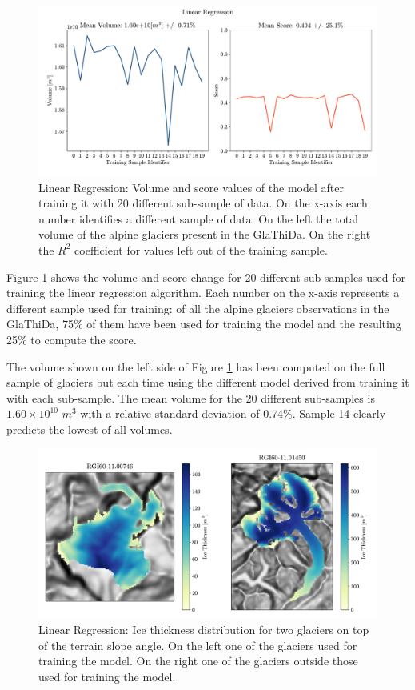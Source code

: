 \begin{figure}[!tp]
	\centering		  
	\includegraphics[width=1.\textwidth]{figures/LR_score.pdf}
	\caption{Linear Regression: Volume and score values of the model after training it with 20 different sub-sample of data. On the x-axis each number identifies a different sample of data. On the left the total volume of the alpine glaciers present in the GlaThiDa. On the right the $R^2$ coefficient for values left out of the training sample.}
	\label{fig:lr-score}
\end{figure}

Figure \ref{fig:lr-score} shows the volume and score change  for 20 different sub-samples used for training the linear regression algorithm. Each number on the x-axis represents a different sample used for training: of all the alpine glaciers observations in the GlaThiDa, 75\% of them have been used for  training the model and the resulting 25\% to compute the score. 

The volume shown on the left side of Figure \ref{fig:lr-score} has been computed on the full sample of glaciers but each time using the different model derived from training it with each sub-sample. The mean volume for the 20 different sub-samples is $1.60\times 10^{10}$ $m^3$ with a relative standard deviation of 0.74\%. Sample 14 clearly predicts the lowest of all volumes.

\begin{figure}[!tp]
	\centering		  
	\includegraphics[width=1.\textwidth]{figures/LR_thick_map.pdf}
	\caption{Linear Regression: Ice thickness distribution for two glaciers on top of the terrain slope angle. On the left one of the glaciers used for training the model. On the right one of the glaciers outside those used for training the model.}
	\label{fig:lr-map}
\end{figure}

